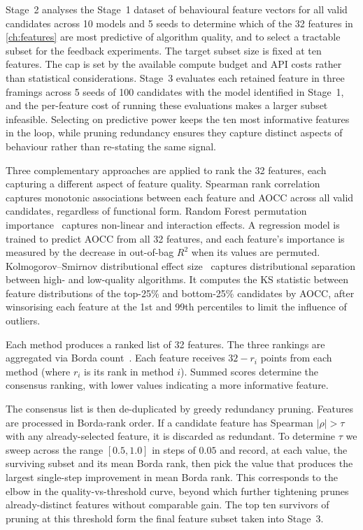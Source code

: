 Stage~2 analyses the Stage~1 dataset of behavioural feature vectors for all valid candidates across 10 models and 5 seeds to determine which of the 32 features in \cref{ch:features} are most predictive of algorithm quality, and to select a tractable subset for the feedback experiments. The target subset size is fixed at ten features. The cap is set by the available compute budget and API costs rather than statistical considerations. Stage~3 evaluates each retained feature in three framings across 5 seeds of 100 candidates with the model identified in Stage~1, and the per-feature cost of running these evaluations makes a larger subset infeasible. Selecting on predictive power keeps the ten most informative features in the loop, while pruning redundancy ensures they capture distinct aspects of behaviour rather than re-stating the same signal.

Three complementary approaches are applied to rank the 32 features, each capturing a different aspect of feature quality. Spearman rank correlation~\cite{spearman1904proof} captures monotonic associations between each feature and AOCC across all valid candidates, regardless of functional form. Random Forest permutation importance~\cite{breiman2001randomforests} captures non-linear and interaction effects. A regression model is trained to predict AOCC from all 32 features, and each feature's importance is measured by the decrease in out-of-bag $R^2$ when its values are permuted. Kolmogorov--Smirnov distributional effect size~\cite{kolmogorov1933} captures distributional separation between high- and low-quality algorithms. It computes the KS statistic between feature distributions of the top-25\% and bottom-25\% candidates by AOCC, after winsorising each feature at the 1st and 99th percentiles to limit the influence of outliers.

Each method produces a ranked list of 32 features. The three rankings are aggregated via Borda count~\cite{black1958theory}. Each feature receives $32 - r_i$ points from each method (where $r_i$ is its rank in method $i$). Summed scores determine the consensus ranking, with lower values indicating a more informative feature.

The consensus list is then de-duplicated by greedy redundancy pruning. Features are processed in Borda-rank order. If a candidate feature has Spearman $|\rho| > \tau$ with any already-selected feature, it is discarded as redundant. To determine $\tau$ we sweep across the range $[0.5, 1.0]$ in steps of $0.05$ and record, at each value, the surviving subset and its mean Borda rank, then pick the value that produces the largest single-step improvement in mean Borda rank. This corresponds to the elbow in the quality-vs-threshold curve, beyond which further tightening prunes already-distinct features without comparable gain. The top ten survivors of pruning at this threshold form the final feature subset taken into Stage~3.

